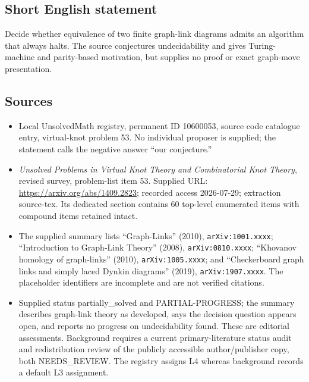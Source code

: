 \documentclass[11pt]{article}
\begin{document}
\subsection{Short English statement}
Decide whether equivalence of two finite graph-link diagrams admits an algorithm that always halts. The source conjectures undecidability and gives Turing-machine and parity-based motivation, but supplies no proof or exact graph-move presentation.
\subsection{Sources}
\begin{itemize}
\item Local UnsolvedMath registry, permanent ID 10600053, source code catalogue entry, virtual-knot problem 53. No individual proposer is supplied; the statement calls the negative answer ``our conjecture.''
\item \emph{Unsolved Problems in Virtual Knot Theory and Combinatorial Knot Theory}, revised survey, problem-list item 53. Supplied URL: \url{https://arxiv.org/abs/1409.2823}; recorded access 2026-07-29; extraction source-tex. Its dedicated section contains 60 top-level enumerated items with compound items retained intact.
\item The supplied summary lists ``Graph-Links'' (2010), \texttt{arXiv:1001.xxxx}; ``Introduction to Graph-Link Theory'' (2008), \texttt{arXiv:0810.xxxx}; ``Khovanov homology of graph-links'' (2010), \texttt{arXiv:1005.xxxx}; and ``Checkerboard graph links and simply laced Dynkin diagrams'' (2019), \texttt{arXiv:1907.xxxx}. The placeholder identifiers are incomplete and are not verified citations.
\item Supplied status partially\_solved and PARTIAL-PROGRESS; the summary describes graph-link theory as developed, says the decision question appears open, and reports no progress on undecidability found. These are editorial assessments. Background requires a current primary-literature status audit and redistribution review of the publicly accessible author/publisher copy, both NEEDS\_REVIEW. The registry assigns L4 whereas background records a default L3 assignment.
\end{itemize}
\end{document}
